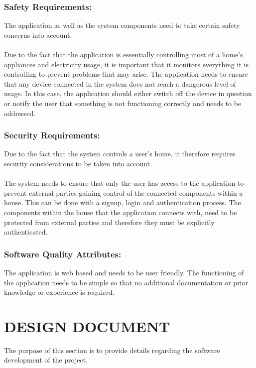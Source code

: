 \documentclass[10pt,twocolumn]{witseiepaper}
\begin{document}
	\subsubsection{Safety Requirements:} 
	The application as well as the system components need to take certain safety concerns into account. 
	\\\\
	Due to the fact that the application is essentially controlling most of a home's appliances and electricity usage, it is important that it monitors everything it is controlling to prevent problems that may arise. The application needs to ensure that any device connected in the system does not reach a dangerous level of usage. In this case, the application should either switch off the device in question or notify the user that something is not functioning correctly and needs to be addressed. 
	
	\subsubsection{Security Requirements:}
	Due to the fact that the system controls a user's home, it therefore requires security considerations to be taken into account.
	\\\\
	The system needs to ensure that only the user has access to the application to prevent external parties gaining control of the connected components within a house. This can be done with a signup, login and authentication process. 
	The components within the house that the application connects with, need to be protected from external parties and therefore they must be explicitly authenticated. 
	
	\subsubsection{Software Quality Attributes:}
	The application is web based and needs to be user friendly. The functioning of the application needs to be simple so that no additional documentation or prior knowledge or experience is required. 
	
	\section{DESIGN DOCUMENT}
	
	The purpose of this section is to provide details regarding the software development of the project. 
	
\end{document}
